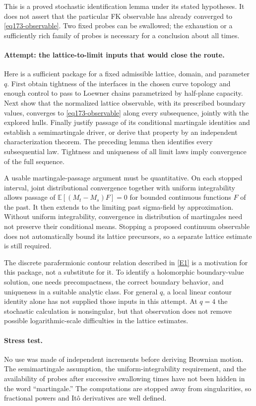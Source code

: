 \documentclass[11pt,a4paper]{article}
\newcommand{\E}{\mathbb{E}}
\newcommand{\eref}[2]{\hyperlink{extra:#1:#2}{[E#2]}}
\numberwithin{equation}{section}
\begin{document}
This is a proved stochastic identification lemma under its stated
hypotheses. It does not assert that the particular FK observable has
already converged to \eqref{eq173-observable}. Two fixed probes can be
swallowed; the exhaustion or a sufficiently rich family of probes is
necessary for a conclusion about all times.

\paragraph{Attempt: the lattice-to-limit inputs that would close the route.}
Here is a sufficient package for a fixed admissible lattice, domain, and
parameter $q$. First obtain tightness of the interfaces in the chosen curve
topology and enough control to pass to Loewner chains parametrized by
half-plane capacity. Next show that the normalized lattice observable,
with its prescribed boundary values, converges to
\eqref{eq173-observable} along every subsequence, jointly with the explored
hulls. Finally justify passage of its conditional martingale identities
and establish a semimartingale driver, or derive that property by an
independent characterization theorem. The preceding lemma then identifies
every subsequential law. Tightness and uniqueness of all limit laws imply
convergence of the full sequence.

A usable martingale-passage argument must be quantitative. On each stopped
interval, joint distributional convergence together with uniform
integrability allows passage of
$\E[(M_t-M_s)F]=0$ for bounded continuous functions $F$ of the past.
It then extends to the limiting past sigma-field by approximation. Without
uniform integrability, convergence in distribution of martingales need
not preserve their conditional means. Stopping a proposed continuum
observable does not automatically bound its lattice precursors, so a
separate lattice estimate is still required.

The discrete parafermionic contour relation described in \eref{30006768}{1}
is a motivation for this package, not a substitute for it. To identify a
holomorphic boundary-value solution, one needs precompactness, the correct
boundary behavior, and uniqueness in a suitable analytic class. For general
$q$, a local linear contour identity alone has not supplied those inputs
in this attempt. At $q=4$ the stochastic calculation is nonsingular, but
that observation does not remove possible logarithmic-scale difficulties
in the lattice estimates.

\paragraph{Stress test.}
No use was made of independent increments before deriving Brownian motion.
The semimartingale assumption, the uniform-integrability requirement, and
the availability of probes after successive swallowing times have not been
hidden in the word ``martingale.'' The computations are stopped away from
singularities, so fractional powers and It\^o derivatives are well defined.
\end{document}
